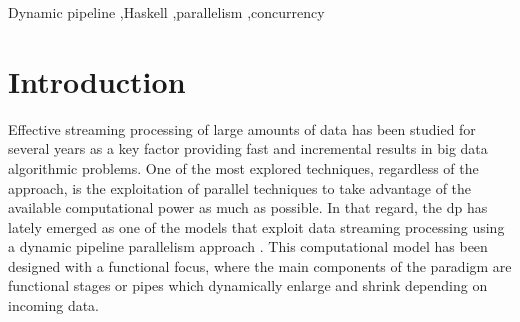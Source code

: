\documentclass[preprint]{elsarticle}
\begin{document}
\begin{abstract}
\end{abstract}

\begin{keyword}
Dynamic pipeline \sep Haskell \sep parallelism \sep concurrency
\end{keyword}

\maketitle

\section{Introduction}\label{intro}
Effective streaming processing of large amounts of data has been studied for several years \cite{enumeratingsg, exploting, onthefly} as a key factor providing fast and incremental results in big data algorithmic problems. One of the most explored techniques, regardless of the approach, is the exploitation of parallel techniques to take advantage of the available computational power as much as possible. In that regard, the \acrfull{dp} \cite{dpdef} has lately emerged as one of the models that exploit data streaming processing using a dynamic pipeline parallelism approach \cite{onthefly}. This computational model has been designed with a functional focus, where the main components of the paradigm are functional stages or pipes which dynamically enlarge and shrink depending on incoming data.  
\end{document}
